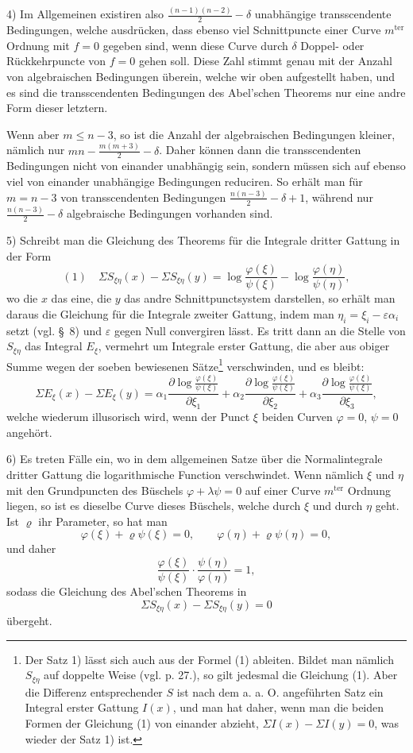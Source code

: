 \documentclass[10pt]{article}
\begin{document}
4) Im Allgemeinen existiren also $\frac{(n-1)(n-2)}{2}-\delta$ unabhängige transscendente Bedingungen, welche ausdrücken, dass ebenso viel Schnittpuncte einer Curve $m^{\text{ter}}$ Ordnung mit $f=0$ gegeben sind, wenn diese Curve durch $\delta$ Doppel- oder Rückkehrpuncte von $f=0$ gehen soll. Diese Zahl stimmt genau mit der Anzahl von algebraischen Bedingungen überein, welche wir oben aufgestellt haben, und es sind die transscendenten Bedingungen des Abel'schen Theorems nur eine andre Form dieser letztern.

Wenn aber $m\leq n-3$, so ist die Anzahl der algebraischen Bedingungen kleiner, nämlich nur $mn-\frac{m(m+3)}{2}-\delta$. Daher können dann die transscendenten Bedingungen nicht von einander unabhängig sein, sondern müssen sich auf ebenso viel von einander unabhängige Bedingungen reduciren. So erhält man für $m=n-3$ von transscendenten Bedingungen $\frac{n(n-3)}{2}-\delta+1$, während nur $\frac{n(n-3)}{2}-\delta$ algebraische Bedingungen vorhanden sind.

5) Schreibt man die Gleichung des Theorems für die Integrale dritter Gattung in der Form
\[
(1)\quad \Sigma S_{\xi\eta}(x)-\Sigma S_{\xi\eta}(y)
=\log\frac{\varphi(\xi)}{\psi(\xi)}-\log\frac{\varphi(\eta)}{\psi(\eta)},
\]
wo die $x$ das eine, die $y$ das andre Schnittpunctsystem darstellen, so erhält man daraus die Gleichung für die Integrale zweiter Gattung, indem man $\eta_i=\xi_i-\varepsilon\alpha_i$ setzt (vgl. \S\ 8) und $\varepsilon$ gegen Null convergiren lässt. Es tritt dann an die Stelle von $S_{\xi\eta}$ das Integral $E_\xi$, vermehrt um Integrale erster Gattung, die aber aus obiger Summe wegen der soeben bewiesenen Sätze\footnote{Der Satz 1) lässt sich auch aus der Formel (1) ableiten. Bildet man nämlich $S_{\xi\eta}$ auf doppelte Weise (vgl. p. 27.), so gilt jedesmal die Gleichung (1). Aber die Differenz entsprechender $S$ ist nach dem a. a. O. angeführten Satz ein Integral erster Gattung $I(x)$, und man hat daher, wenn man die beiden Formen der Gleichung (1) von einander abzieht, $\Sigma I(x)-\Sigma I(y)=0$, was wieder der Satz 1) ist.} verschwinden, und es bleibt:
\[
\Sigma E_\xi(x)-\Sigma E_\xi(y)
=\alpha_1\frac{\partial\log\frac{\varphi(\xi)}{\psi(\xi)}}{\partial\xi_1}
+\alpha_2\frac{\partial\log\frac{\varphi(\xi)}{\psi(\xi)}}{\partial\xi_2}
+\alpha_3\frac{\partial\log\frac{\varphi(\xi)}{\psi(\xi)}}{\partial\xi_3},
\]
welche wiederum illusorisch wird, wenn der Punct $\xi$ beiden Curven $\varphi=0$, $\psi=0$ angehört.

6) Es treten Fälle ein, wo in dem allgemeinen Satze über die Normalintegrale dritter Gattung die logarithmische Function verschwindet. Wenn nämlich $\xi$ und $\eta$ mit den Grundpuncten des Büschels $\varphi+\lambda\psi=0$ auf einer Curve $m^{\text{ter}}$ Ordnung liegen, so ist es dieselbe Curve dieses Büschels, welche durch $\xi$ und durch $\eta$ geht. Ist $\varrho$ ihr Parameter, so hat man
\[
\varphi(\xi)+\varrho\psi(\xi)=0,
\qquad
\varphi(\eta)+\varrho\psi(\eta)=0,
\]
und daher
\[
\frac{\varphi(\xi)}{\psi(\xi)}\cdot\frac{\psi(\eta)}{\varphi(\eta)}=1,
\]
sodass die Gleichung des Abel'schen Theorems in
\[
\Sigma S_{\xi\eta}(x)-\Sigma S_{\xi\eta}(y)=0
\]
übergeht.
\end{document}

